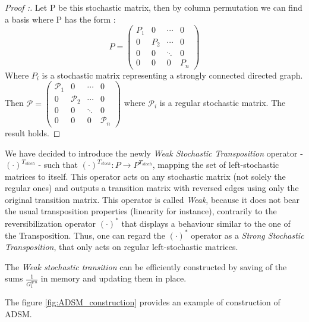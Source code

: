 \documentclass[sn-mathphys]{sn-jnl}%
\theoremstyle{thmstyleone}%
\theoremstyle{thmstyletwo}%
\theoremstyle{thmstylethree}%
\begin{document}
\begin{proof}[Proof :] Let P be this stochastic matrix, then by column
  permutation we can find a basis where P has the form
  : \begin{equation}
P = \begin{pmatrix}
P_1 & 0 & \cdots & 0\\
0 & P_2 & \cdots & 0 \\
0 & 0 & \ddots & 0\\
0 & 0 & 0 & P_n
\end{pmatrix}
\end{equation}
Where $P_i$ is a stochastic matrix representing a strongly connected
directed graph. Then
$\mathcal{P} = \begin{pmatrix} \mathcal{P}_1 & 0 & \cdots & 0\\
  0 & \mathcal{P}_2 & \cdots & 0 \\
  0 & 0 & \ddots & 0\\
  0 & 0 & 0 & \mathcal{P}_n
\end{pmatrix}$ where $\mathcal{P}_i$ is a regular stochastic matrix. The result holds.
\end{proof}

We have decided to introduce the newly \textit{Weak Stochastic
  Transposition} operator - $(\cdot)^{T_{stoch}}$ - such that
$(\cdot)^{T_{stoch}}: P \rightarrow P^{T_{stoch}}$, mapping the set of
left-stochastic matrices to itself. This operator acts on any
stochastic matrix (not solely the regular ones) and outputs a
transition matrix with reversed edges using only the original
transition matrix. This operator is called \textit{Weak}, because it
does not bear the usual transposition properties (linearity for
instance), contrarily to the reversibilization operator $(\cdot)^*$
that displays a behaviour similar to the one of the
Transposition. Thus, one can regard the $(\cdot)^*$ operator as a
\textit{Strong Stochastic Transposition}, that only acts on regular
left-stochastic matrices.

The \textit{Weak stochastic transition} can be efficiently constructed
by saving of the sums $\frac{1}{G^{gen}_1}$ in memory and updating
them in place.

The figure \ref{fig:ADSM_construction} provides an example of
construction of ADSM.
\end{document}
